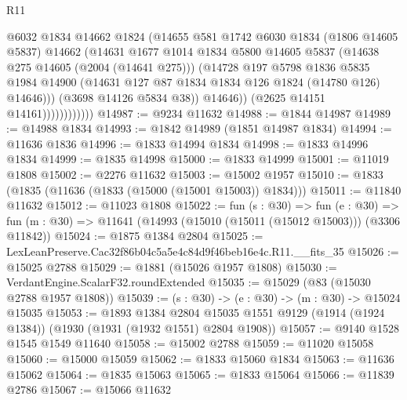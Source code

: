 \begin{lexlean}{R11}
\begin{coremodule}
                              @6032
                              @1834
                              @14662
                              @1824
                              (@14655
                                @581
                                @1742
                                @6030
                                @1834
                                (@1806 @14605 @5837)
                                @14662
                                (@14631
                                  @1677
                                  @1014
                                  @1834
                                  @5800
                                  @14605
                                  @5837
                                  (@14638 @275 @14605 (@2004 (@14641 @275)))
                                  (@14728
                                    @197
                                    @5798
                                    @1836
                                    @5835
                                    @1984
                                    @14900
                                    (@14631 @127 @87 @1834 @1834 @126 @1824 (@14780 @126) @14646)))
                                (@3698 @14126 @5834 @38))
                              @14646))
                          (@2625 @14151 @14161))))))))))))
@14987 := @9234 @11632
@14988 := @1844 @14987
@14989 := @14988 @1834
@14993 := @1842 @14989 (@1851 @14987 @1834)
@14994 := @11636 @1836
@14996 := @1833 @14994 @1834
@14998 := @1833 @14996 @1834
@14999 := @1835 @14998
@15000 := @1833 @14999
@15001 := @11019 @1808
@15002 := @2276 @11632
@15003 := @15002 @1957
@15010 := @1833 (@1835 (@11636 (@1833 (@15000 (@15001 @15003)) @1834)))
@15011 := @11840 @11632
@15012 := @11023 @1808
@15022 := fun (s : @30) =>
  fun (e : @30) => fun (m : @30) => @11641 (@14993 (@15010 (@15011 (@15012 @15003))) (@3306 @11842))
@15024 := @1875 @1384 @2804
@15025 := LexLeanPreserve.Cac32f86b04c5a5e4c84d9f46beb16e4c.R11.__fits_35
@15026 := @15025 @2788
@15029 := @1881 (@15026 @1957 @1808)
@15030 := VerdantEngine.ScalarF32.roundExtended
@15035 := @15029 (@83 (@15030 @2788 @1957 @1808))
@15039 := (s : @30) -> (e : @30) -> (m : @30) -> @15024 @15035
@15053 := @1893
    @1384
    @2804
    @15035
    @1551
    @9129
    (@1914 (@1924 @1384))
    (@1930 (@1931 (@1932 @1551) @2804 @1908))
@15057 := @9140 @1528 @1545 @1549 @11640
@15058 := @15002 @2788
@15059 := @11020 @15058
@15060 := @15000 @15059
@15062 := @1833 @15060 @1834
@15063 := @11636 @15062
@15064 := @1835 @15063
@15065 := @1833 @15064
@15066 := @11839 @2786
@15067 := @15066 @11632

\end{coremodule}
\end{lexlean}
